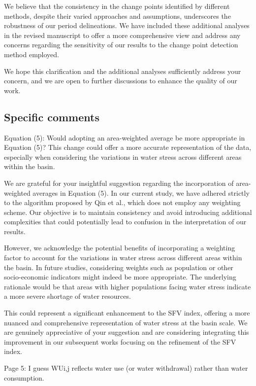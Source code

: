 \AR*{} We believe that the consistency in the change points identified by different methods, despite their varied approaches and assumptions, underscores the robustness of our period delineations. We have included these additional analyses in the revised manuscript to offer a more comprehensive view and address any concerns regarding the sensitivity of our results to the change point detection method employed.

\AR*{} We hope this clarification and the additional analyses sufficiently address your concern, and we are open to further discussions to enhance the quality of our work.

\subsection*{Specific comments}

\RC{} Equation (5): Would adopting an area-weighted average be more appropriate in Equation (5)? This change could offer a more accurate representation of the data, especially when considering the variations in water stress across different areas within the basin.

\AR{} We are grateful for your insightful suggestion regarding the incorporation of area-weighted averages in Equation (5). In our current study, we have adhered strictly to the algorithm proposed by Qin et al., which does not employ any weighting scheme. Our objective is to maintain consistency and avoid introducing additional complexities that could potentially lead to confusion in the interpretation of our results.

\AR*{} However, we acknowledge the potential benefits of incorporating a weighting factor to account for the variations in water stress across different areas within the basin. In future studies, considering weights such as population or other socio-economic indicators might indeed be more appropriate. The underlying rationale would be that areas with higher populations facing water stress indicate a more severe shortage of water resources.

\AR*{} This could represent a significant enhancement to the SFV index, offering a more nuanced and comprehensive representation of water stress at the basin scale. We are genuinely appreciative of your suggestion and are considering integrating this improvement in our subsequent works focusing on the refinement of the SFV index.

\RC{} Page 5: I guess WUi,j reflects water use (or water withdrawal) rather than water consumption.

